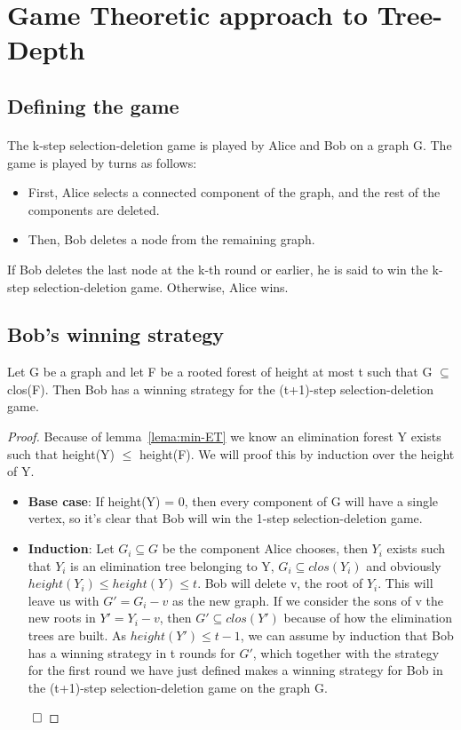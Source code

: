 \section{Game Theoretic approach to Tree-Depth}

\subsection{Defining the game}
\paragraph{}
The k-step selection-deletion game is played by Alice and Bob on a graph G. The game is played by turns as follows:
\begin{itemize}
  \item First, Alice selects a connected component of the graph, and the rest of the components are deleted.
  \item Then, Bob deletes a node from the remaining graph.
\end{itemize}

If Bob deletes the last node at the k-th round or earlier, he is said to win the k-step selection-deletion game. Otherwise, Alice wins.

\subsection{Bob's winning strategy}
\begin{lemma}
Let G be a graph and let F be a rooted forest of height at most t such that G $\subseteq$ clos(F). Then Bob has a winning strategy for the (t+1)-step selection-deletion game.
\end{lemma}
\begin{proof}
Because of lemma~\ref{lema:min-ET} we know an elimination forest Y exists such that height(Y) $\leq$ height(F).
We will proof this by induction over the height of Y.
\begin{itemize}
  \item \textbf{Base case}: If height(Y) = 0, then every component of G will have a single vertex, so it's clear that Bob will win the 1-step selection-deletion game.
  \item \textbf{Induction}: Let $G_i \subseteq G$ be the component Alice chooses, then $Y_i$ exists such that $Y_i$ is an elimination tree belonging to Y, $G_i \subseteq clos(Y_i)$ and obviously $height(Y_i) \leq height(Y) \leq t$. Bob will delete v, the root of $Y_i$. This will leave us with $G' = G_i - v$ as the new graph. If we consider the sons of v the new roots in $Y' = Y_i - v$, then $G' \subseteq clos(Y')$ because of how the elimination trees are built. As $height(Y') \leq t-1$, we can assume by induction that Bob has a winning strategy in t rounds for $G'$, which together with the strategy for the first round we have just defined makes a winning strategy for Bob in the (t+1)-step selection-deletion game on the graph G.
\end{itemize}
$\qed$
\end{proof}

